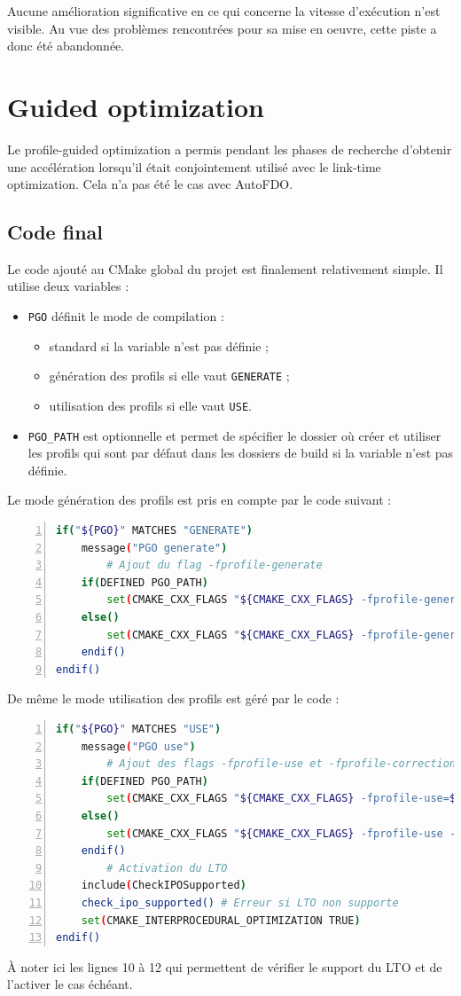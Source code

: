 \documentclass[a4paper,11pt]{report}
\begin{document}
Aucune amélioration significative en ce qui concerne la vitesse d'exécution n'est visible.
Au vue des problèmes rencontrées pour sa mise en oeuvre, cette piste a donc été abandonnée.

\section{Guided optimization}
Le profile-guided optimization a permis pendant les phases de recherche d'obtenir une accélération lorsqu'il était conjointement utilisé avec le link-time optimization.
Cela n'a pas été le cas avec AutoFDO.

\subsection{Code final}
Le code ajouté au CMake global du projet est finalement relativement simple.
Il utilise deux variables :
\begin{itemize}
    \item \verb'PGO' définit le mode de compilation :
          \begin{itemize}
              \item standard si la variable n'est pas définie ;
              \item génération des profils si elle vaut \verb'GENERATE' ;
              \item utilisation des profils si elle vaut \verb'USE'.
          \end{itemize}
    \item \verb'PGO_PATH' est optionnelle et permet de spécifier le dossier où créer et utiliser les profils qui sont par défaut dans les dossiers de build si la variable n'est pas définie.
\end{itemize}

Le mode génération des profils est pris en compte par le code suivant :
\begin{lstlisting}[language=bash,numbers=left]
if("${PGO}" MATCHES "GENERATE")
	message("PGO generate")
        # Ajout du flag -fprofile-generate
	if(DEFINED PGO_PATH)
		set(CMAKE_CXX_FLAGS "${CMAKE_CXX_FLAGS} -fprofile-generate=${PGO_PATH}")
	else()
		set(CMAKE_CXX_FLAGS "${CMAKE_CXX_FLAGS} -fprofile-generate")
	endif()
endif()
\end{lstlisting}

De même le mode utilisation des profils est géré par le code :
\begin{lstlisting}[language=bash,numbers=left]
if("${PGO}" MATCHES "USE")
	message("PGO use")
        # Ajout des flags -fprofile-use et -fprofile-correction
	if(DEFINED PGO_PATH)
		set(CMAKE_CXX_FLAGS "${CMAKE_CXX_FLAGS} -fprofile-use=${PGO_PATH} -fprofile-correction")
	else()
		set(CMAKE_CXX_FLAGS "${CMAKE_CXX_FLAGS} -fprofile-use -fprofile-correction")
	endif()
        # Activation du LTO
	include(CheckIPOSupported)
	check_ipo_supported() # Erreur si LTO non supporte
	set(CMAKE_INTERPROCEDURAL_OPTIMIZATION TRUE)
endif()
\end{lstlisting}
À noter ici les lignes 10 à 12 qui permettent de vérifier le support du LTO et de l'activer le cas échéant.
\end{document}
